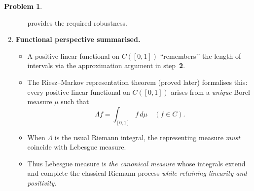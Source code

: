 \documentclass[12pt]{article}
\theoremstyle{definition} %
\newtheorem{problem}{Problem}
\theoremstyle{plain} %
\begin{document}
\begin{problem}
\begin{enumerate}
\begin{enumerate}[label=(\alph*)]
                  provides the required robustness.
        \end{enumerate}
  \item \textbf{Functional perspective summarised.}
        \begin{itemize}
            \item A positive linear functional on $C([0,1])$
                  ``remembers’’ the length of intervals via the
                  approximation argument in step~\textbf{2}.
            \item The Riesz–Markov representation theorem
                  (proved later) formalises this:
                  every positive linear functional on $C([0,1])$
                  arises from a \emph{unique} Borel measure $\mu$
                  such that
                  \[
                      \Lambda f=\int_{[0,1]} f\,d\mu
                      \quad (f\in C).
                  \]
            \item When $\Lambda$ is the usual Riemann integral,
                  the representing measure \emph{must} coincide with
                  Lebesgue measure.
            \item Thus Lebesgue measure is \emph{the canonical measure}
                  whose integrals extend and complete the classical
                  Riemann process \emph{while retaining linearity and
                  positivity}.
        \end{itemize}
  \end{enumerate}
\end{problem}
\end{document}
